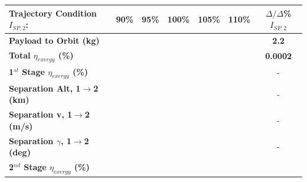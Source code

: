 \begin{table}[ht!] %
	\centering
	\begin{tabular}{l c c c c c c} 
		\hline \textbf{Trajectory Condition}   \qquad  $I_{SP,2}$:
		&90\%
		&95\%
		&100\%
		&105\%
		&110\%
		& $\Delta/\Delta$\%$I_{SP,2}$
		\\
		\hline \textbf{Payload to Orbit (kg)}
		& \textbf{\PayloadToOrbitIspNinetyNoReturn}
		& \textbf{\PayloadToOrbitIspNinetyFiveNoReturn}
		& \textbf{\PayloadToOrbitIspStandardNoReturn}
		& \textbf{\PayloadToOrbitIspOneHundredFiveNoReturn}
		& \textbf{\PayloadToOrbitIspOneHundredTenNoReturn}
		&\textbf{2.2}
		\\
		\textbf{Total $\eta_{exergy}$ (\%)}
		& \textbf{\totalExergyEffIspNinetyNoReturn}
		& \textbf{\totalExergyEffIspNinetyFiveNoReturn}
		& \textbf{\totalExergyEffIspStandardNoReturn}
		& \textbf{\totalExergyEffIspOneHundredFiveNoReturn}
		& \textbf{\totalExergyEffIspOneHundredTenNoReturn}
		& \textbf{0.0002}
		\\
		\hline 
		\textbf{1$^{st}$ Stage $\eta_{exergy}$ (\%)}
		& \textbf{\firstExergyEffIspNinetyNoReturn}
		& \textbf{\firstExergyEffIspNinetyFiveNoReturn}
		& \textbf{\firstExergyEffIspStandardNoReturn}
		& \textbf{\firstExergyEffIspOneHundredFiveNoReturn}
		& \textbf{\firstExergyEffIspOneHundredTenNoReturn}
		& -
		\\
		\textbf{Separation Alt, 1$\rightarrow$2 (km)}
		& \firstsecondSeparationAltIspNinetyNoReturn
		& \firstsecondSeparationAltIspNinetyFiveNoReturn
		& \firstsecondSeparationAltIspStandardNoReturn
		& \firstsecondSeparationAltIspOneHundredFiveNoReturn
		& \firstsecondSeparationAltIspOneHundredTenNoReturn
		& -
		\\
		\textbf{Separation v, 1$\rightarrow$2 (m/s)}
		& \firstsecondSeparationvIspNinetyNoReturn
		& \firstsecondSeparationvIspNinetyFiveNoReturn
		& \firstsecondSeparationvIspStandardNoReturn
		& \firstsecondSeparationvIspOneHundredFiveNoReturn
		& \firstsecondSeparationvIspOneHundredTenNoReturn
		& -
		\\
		\textbf{Separation $\gamma$, 1$\rightarrow$2 (deg)}
		& \firstsecondSeparationgammaIspNinetyNoReturn
		& \firstsecondSeparationgammaIspNinetyFiveNoReturn
		& \firstsecondSeparationgammaIspStandardNoReturn
		& \firstsecondSeparationgammaIspOneHundredFiveNoReturn
		& \firstsecondSeparationgammaIspOneHundredTenNoReturn
		& -
		\\
		\hline 
		\textbf{2$^{nd}$ Stage $\eta_{exergy}$ (\%)}
		& \textbf{\secondExergyEffIspNinetyNoReturn}
		& \textbf{\secondExergyEffIspNinetyFiveNoReturn}

\end{tabular}
\end{table}
